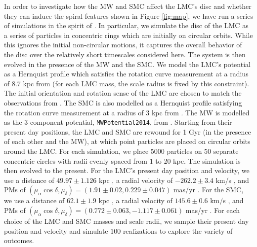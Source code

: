 \documentclass[a4paper,useAMS,usenatbib]{mnras}
\begin{document}
In order to investigate how the MW and SMC affect the LMC's disc and
whether they can induce the spiral features shown in Figure
\ref{fig:map}, we have run a series of simulations in the spirit of
\cite{Toomre1972}. In particular, we simulate the disc of the LMC as a
series of particles in concentric rings which are initially on
circular orbits. While this ignores the initial non-circular motions,
it captures the overall behavior of the disc over the relatively short
timescales considered here. The system is then evolved in the presence
of the MW and the SMC. We model the LMC's potential as a Hernquist
profile \citep{hernquist_profile} which satisfies the rotation curve
measurement at a radius of 8.7 kpc from \cite{vandermarel_lmc} (for
each LMC mass, the scale radius is fixed by this constraint). The
initial orientation and rotation sense of the LMC are chosen to match
the observations from \cite{vandermarel_lmc}. The SMC is also modelled
as a Hernquist profile satisfying the rotation curve measurement at a
radius of 3 kpc from \cite{staminirovic_smc_mass}. The MW is modelled
as the 3-component potential, \texttt{MWPotential2014}, from
\cite{galpy}. Starting from their present day positions, the LMC and
SMC are rewound for 1 Gyr (in the presence of each other and the MW),
at which point particles are placed on circular orbits around the
LMC. For each simulation, we place 5000 particles on 50 separate
concentric circles with radii evenly spaced from 1 to 20 kpc. The
simulation is then evolved to the present. For the LMC's present day
position and velocity, we use a distance of $49.97 \pm 1.126$ kpc
\citep{pietrzynski_lmc_dist}, a radial velocity of $-262.2\pm3.4$ km/s
\citep{vandermarel_lmc_rv}, and PMs of $(\mu_\alpha \cos \delta,
\mu_\delta) = (1.91\pm 0.02,0.229\pm0.047)$ mas/yr
\citep{kallivayalil_lmc_pm}. For the SMC, we use a distance of
$62.1\pm1.9$ kpc \citep{graczyk_smc_distance}, a radial velocity of
$145.6\pm0.6$ km/s \citep{harris_smc_vel}, and PMs of $(\mu_\alpha
\cos \delta, \mu_\delta) = (0.772\pm 0.063,-1.117\pm0.061)$ mas/yr
\citep{kallivayalil_lmc_pm}. For each choice of the LMC and SMC masses
and scale radii, we sample their present day position and velocity and
simulate 100 realizations to explore the variety of outcomes.
\end{document}
